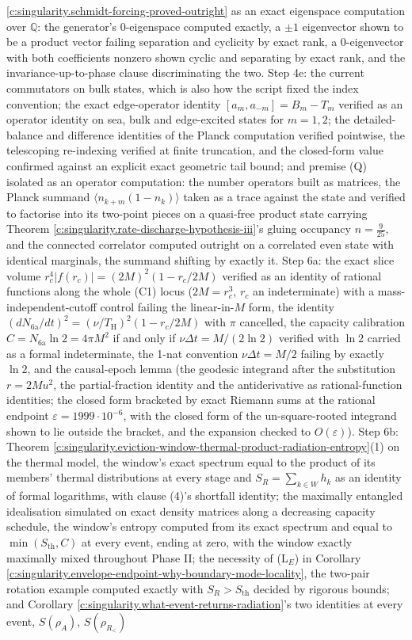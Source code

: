 \documentclass[11pt]{article}
\theoremstyle{definition}
\theoremstyle{plain}
\providecommand{\Sth}{}\renewcommand{\Sth}{S_{\mathrm{th}}}
\providecommand{\TH}{}\renewcommand{\TH}{T_{\mathrm{H}}}
\begin{document}
\ref{c:singularity.schmidt-forcing-proved-outright} as an exact eigenspace computation over $\mathbb{Q}$: the generator's $0$-eigenspace computed exactly, a $\pm 1$ eigenvector shown to be a product vector failing separation and cyclicity by exact rank, a $0$-eigenvector with both coefficients nonzero shown cyclic and separating by exact rank, and the invariance-up-to-phase clause discriminating the two. Step 4e: the current commutators on bulk states, which is also how the script fixed the index convention; the exact edge-operator identity $[a_m, a_{-m}] = B_m - T_m$ verified as an operator identity on sea, bulk and edge-excited states for $m = 1, 2$; the detailed-balance and difference identities of the Planck computation verified pointwise, the telescoping re-indexing verified at finite truncation, and the closed-form value confirmed against an explicit exact geometric tail bound; and premise (Q) isolated as an operator computation: the number operators built as matrices, the Planck summand $\langle n_{k+m}(1 - n_k)\rangle$ taken as a trace against the state and verified to factorise into its two-point pieces on a quasi-free product state carrying Theorem \ref{c:singularity.rate-discharge-hypothesis-iii}'s gluing occupancy $n = \tfrac{9}{25}$, and the connected correlator computed outright on a correlated even state with identical marginals, the summand shifting by exactly it. Step 6a: the exact slice volume $r_c^{4}|f(r_c)| = (2M)^{2}(1 - r_c/2M)$ verified as an identity of rational functions along the whole (C1) locus ($2M = r_c^{3}$, $r_c$ an indeterminate) with a mass-independent-cutoff control failing the linear-in-$M$ form, the identity $(dN_{\mathrm{6a}}/dt)^{2} = (\nu/\TH)^{2}(1 - r_c/2M)$ with $\pi$ cancelled, the capacity calibration $C = N_{\mathrm{6a}}\ln 2 = 4\pi M^{2}$ if and only if $\nu\Delta t = M/(2\ln 2)$ verified with $\ln 2$ carried as a formal indeterminate, the 1-nat convention $\nu\Delta t = M/2$ failing by exactly $\ln 2$, and the causal-epoch lemma (the geodesic integrand after the substitution $r = 2Mu^{2}$, the partial-fraction identity and the antiderivative as rational-function identities; the closed form bracketed by exact Riemann sums at the rational endpoint $\varepsilon = 1999 \cdot 10^{-6}$, with the closed form of the un-square-rooted integrand shown to lie outside the bracket, and the expansion checked to $O(\varepsilon)$). Step 6b: Theorem \ref{c:singularity.eviction-window-thermal-product-radiation-entropy}(1) on the thermal model, the window's exact spectrum equal to the product of its members' thermal distributions at every stage and $S_R = \sum_{k \in W}h_k$ as an identity of formal logarithms, with clause (4)'s shortfall identity; the maximally entangled idealisation simulated on exact density matrices along a decreasing capacity schedule, the window's entropy computed from its exact spectrum and equal to $\min(\Sth, C)$ at every event, ending at zero, with the window exactly maximally mixed throughout Phase II; the necessity of (L$_E$) in Corollary \ref{c:singularity.envelope-endpoint-why-boundary-mode-locality}, the two-pair rotation example computed exactly with $S_R > \Sth$ decided by rigorous bounds; and Corollary \ref{c:singularity.what-event-returns-radiation}'s two identities at every event, $S(\rho_A)$, $S(\rho_{R_<})$ 
\end{document}
